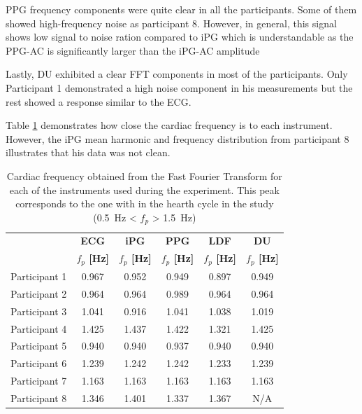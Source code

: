 PPG frequency components were quite clear in all the participants. Some of them showed high-frequency noise as participant 8. However, in general, this signal shows low signal to noise ration compared to iPG which is understandable as the PPG-AC is significantly larger than the iPG-AC amplitude

Lastly, DU exhibited a clear FFT components in most of the participants. Only Participant 1 demonstrated a high noise component in his measurements but the rest showed a response similar to the ECG. 

Table \ref{tbl:fft} demonstrates how close the cardiac frequency is to each instrument. However, the iPG mean harmonic and frequency distribution from participant 8 illustrates that his data was not clean.


\begin{table}[!htbp]
	\caption[Peak frequency calculated obtained form Fast Fourier Transform]{Cardiac frequency obtained from the Fast Fourier Transform for each of the instruments used during the experiment. This peak corresponds to the one with in the hearth cycle in the study (\SI{0.5}{\hertz} < $f_p$ > \SI{1.5}{\hertz})}
	\label{tbl:fft}
	\centering 
	\begin{tabular}{lccccc}
		\toprule
		& \textbf{ECG}
		& \textbf{iPG}
		& \textbf{PPG}
		& \textbf{LDF}
		& \textbf{DU} \\
		& \textbf{$f_p$ [\si{\hertz}]}		
		& \textbf{$f_p$ [\si{\hertz}]}		
		& \textbf{$f_p$ [\si{\hertz}]}
		& \textbf{$f_p$ [\si{\hertz}]}
		& \textbf{$f_p$ [\si{\hertz}]}\\\midrule
	    Participant 1    &     0.967    &     0.952    &     0.949    &     0.897    &     0.949    \\  
		Participant 2    &     0.964    &     0.964    &     0.989    &     0.964    &     0.964    \\  
		Participant 3    &     1.041    &     0.916    &     1.041    &     1.038    &     1.019    \\  
		Participant 4    &     1.425    &     1.437    &     1.422    &     1.321    &     1.425    \\  
		Participant 5    &     0.940    &     0.940    &     0.937    &     0.940    &     0.940    \\  
		Participant 6    &     1.239    &     1.242    &     1.242    &     1.233    &     1.239    \\  
		Participant 7    &     1.163    &     1.163    &     1.163    &     1.163    &     1.163    \\  
		Participant 8    &     1.346    &     1.401    &     1.337    &     1.367    &     N/A    \\  
 
	\bottomrule
	\end{tabular}
\end{table}


